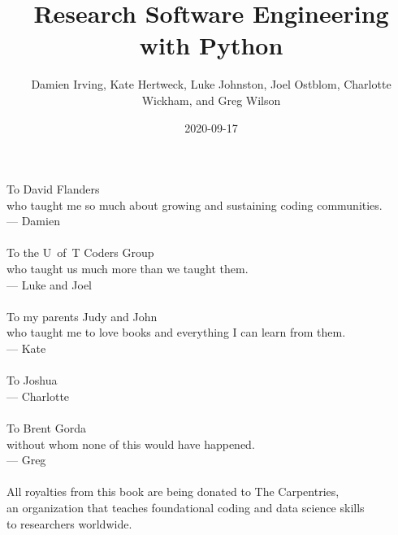 \documentclass[
]{krantz}
\title{Research Software Engineering with Python}
\author{Damien Irving, Kate Hertweck, Luke Johnston, Joel Ostblom, Charlotte Wickham, and Greg Wilson}
\date{2020-09-17}
\begin{document}
\maketitle


\thispagestyle{empty}

\begin{center}
To David Flanders\\
who taught me so much about growing and sustaining coding communities.\\
--- Damien\\

~\\

To the U~of~T Coders Group\\
who taught us much more than we taught them.\\
--- Luke and Joel\\

~\\

To my parents Judy and John\\
who taught me to love books and everything I can learn from them.\\
--- Kate\\

~\\

To Joshua\\
--- Charlotte\\

~\\

To Brent Gorda\\
without whom none of this would have happened.\\
--- Greg\\

~\\

All royalties from this book are being donated to The Carpentries,\\
an organization that teaches foundational coding and data science skills\\
to researchers worldwide.
\end{center}

\setlength{\abovedisplayskip}{-5pt}
\setlength{\abovedisplayshortskip}{-5pt}
\end{document}
